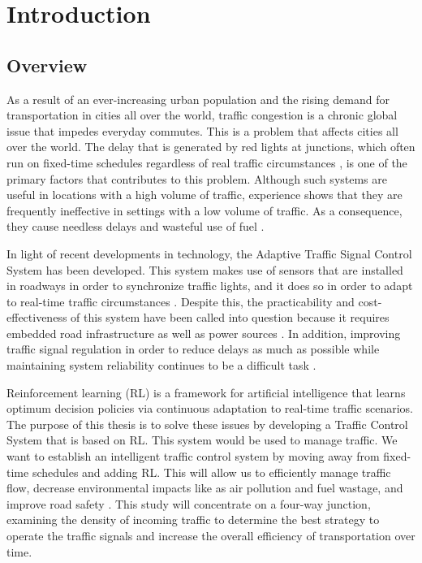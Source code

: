 \chapter{Introduction}
\section{Overview}
As a result of an ever-increasing urban population and the rising demand for transportation in cities all over the world, traffic congestion is a chronic global issue that impedes everyday commutes. \cite{leveinson1998speed, tirachini2013estimation} This is a problem that affects cities all over the world. The delay that is generated by red lights at junctions, which often run on fixed-time schedules regardless of real traffic circumstances \cite{mousavi2017traffic}, is one of the primary factors that contributes to this problem. Although such systems are useful in locations with a high volume of traffic, experience shows that they are frequently ineffective in settings with a low volume of traffic. As a consequence, they cause needless delays and wasteful use of fuel \cite{mousavi2017traffic}.

In light of recent developments in technology, the Adaptive Traffic Signal Control System has been developed. This system makes use of sensors that are installed in roadways in order to synchronize traffic lights, and it does so in order to adapt to real-time traffic circumstances \cite{leveinson1998speed}. Despite this, the practicability and cost-effectiveness of this system have been called into question because it requires embedded road infrastructure as well as power sources \cite{leveinson1998speed}. In addition, improving traffic signal regulation in order to reduce delays as much as possible while maintaining system reliability continues to be a difficult task \cite{mousavi2017traffic}.

Reinforcement learning (RL) is a framework for artificial intelligence that learns optimum decision policies via continuous adaptation to real-time traffic scenarios. The purpose of this thesis is to solve these issues by developing a Traffic Control System that is based on RL. This system would be used to manage traffic. We want to establish an intelligent traffic control system by moving away from fixed-time schedules and adding RL. This will allow us to efficiently manage traffic flow, decrease environmental impacts like as air pollution and fuel wastage, and improve road safety \cite{mousavi2017traffic}. This study will concentrate on a four-way junction, examining the density of incoming traffic to determine the best strategy to operate the traffic signals and increase the overall efficiency of transportation over time.


